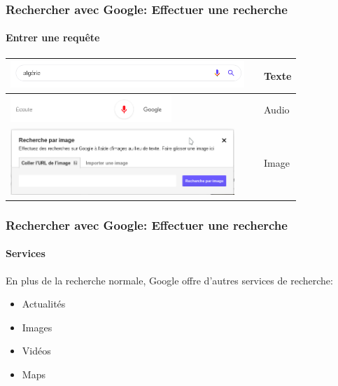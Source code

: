 \documentclass[xcolor=table]{beamer}
\begin{document}
\begin{frame}
\frametitle{Rechercher avec Google: Effectuer une recherche}
\framesubtitle{Entrer une requête}
\begin{tabular}{p{}cp{}}
	
	\hline
	
	 \includegraphics[height=1cm]{..//img/Bweb02-ri-gmail/google-input-text.png} &
	& 
	Texte  \\
	
	\hline
	
	\includegraphics[height=1cm]{..//img/Bweb02-ri-gmail/google-input-audio.png} &
	& 
	Audio \\
	
	\hline
	
	\includegraphics[height=2.5cm]{..//img/Bweb02-ri-gmail/google-input-image.png} & 
	& 
	Image \\
	
	\hline

\end{tabular}

\end{frame}

\begin{frame}
\frametitle{Rechercher avec Google: Effectuer une recherche}
\framesubtitle{Services}

En plus de la recherche normale, Google offre d'autres services de recherche: 
\begin{itemize}
	\item Actualités
	\item Images
	\item Vidéos
	\item Maps
\end{itemize}

\end{frame}
\end{document}
